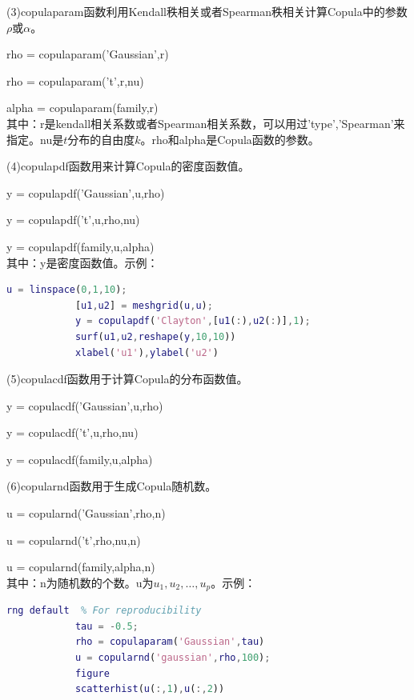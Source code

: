             (3)copulaparam函数利用Kendall秩相关或者Spearman秩相关计算Copula中的参数$\rho$或$\alpha$。\par
            rho = copulaparam('Gaussian',r)\par
            rho = copulaparam('t',r,nu)\par
            alpha = copulaparam(family,r)\\
            其中：r是kendall相关系数或者Spearman相关系数，可以用过'type','Spearman'来指定。nu是$t$分布的自由度$k$。rho和alpha是Copula函数的参数。
            \par
            (4)copulapdf函数用来计算Copula的密度函数值。
            \par
            y = copulapdf('Gaussian',u,rho)\par
            y = copulapdf('t',u,rho,nu)\par
            y = copulapdf(family,u,alpha)\\
            其中：y是密度函数值。示例：
            \begin{lstlisting}[language = Matlab]
            u = linspace(0,1,10);
            [u1,u2] = meshgrid(u,u);
            y = copulapdf('Clayton',[u1(:),u2(:)],1);
            surf(u1,u2,reshape(y,10,10))
            xlabel('u1'),ylabel('u2')
            \end{lstlisting}
            \par
            (5)copulacdf函数用于计算Copula的分布函数值。\par
            y = copulacdf('Gaussian',u,rho)\par
            y = copulacdf('t',u,rho,nu)\par
            y = copulacdf(family,u,alpha)\par
            (6)copularnd函数用于生成Copula随机数。\par
            u = copularnd('Gaussian',rho,n)\par
            u = copularnd('t',rho,nu,n)\par
            u = copularnd(family,alpha,n)\\
            其中：n为随机数的个数。u为$u_1,u_2,\dots,u_p$。示例：
            \begin{lstlisting}[language = Matlab]
            rng default  % For reproducibility
            tau = -0.5;
            rho = copulaparam('Gaussian',tau)
            u = copularnd('gaussian',rho,100);
            figure
            scatterhist(u(:,1),u(:,2))
            \end{lstlisting}


% 
